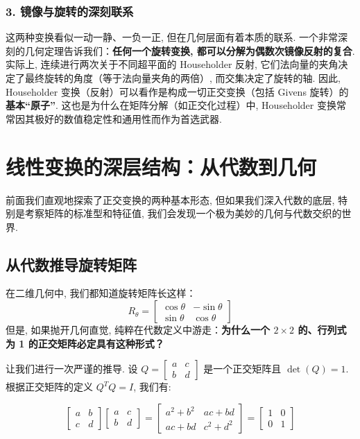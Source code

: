 \documentclass{ctexart}
\begin{document}
\subsubsection{3. 镜像与旋转的深刻联系}

这两种变换看似一动一静、一负一正, 但在几何层面有着本质的联系. 一个非常深刻的几何定理告诉我们：\textbf{任何一个旋转变换, 都可以分解为偶数次镜像反射的复合}. 
实际上, 连续进行两次关于不同超平面的 Householder 反射, 它们法向量的夹角决定了最终旋转的角度（等于法向量夹角的两倍）, 而交集决定了旋转的轴. 因此, Householder 变换（反射）可以看作是构成一切正交变换（包括 Givens 旋转）的\textbf{基本“原子”}. 这也是为什么在矩阵分解（如正交化过程）中, Householder 变换常常因其极好的数值稳定性和通用性而作为首选武器.

\section{线性变换的深层结构：从代数到几何}

前面我们直观地探索了正交变换的两种基本形态, 但如果我们深入代数的底层, 特别是考察矩阵的标准型和特征值, 我们会发现一个极为美妙的几何与代数交织的世界.

\subsection{从代数推导旋转矩阵}

在二维几何中, 我们都知道旋转矩阵长这样：
$$R_\theta = \begin{bmatrix} \cos\theta & -\sin\theta \\ \sin\theta & \cos\theta \end{bmatrix}$$
但是, 如果抛开几何直觉, 纯粹在代数定义中游走：\textbf{为什么一个 $2 \times 2$ 的、行列式为 1 的正交矩阵必定具有这种形式？}

让我们进行一次严谨的推导. 设 $Q = \begin{bmatrix} a & c \\ b & d \end{bmatrix}$ 是一个正交矩阵且 $\det(Q)=1$. 
根据正交矩阵的定义 $Q^T Q = I$, 我们有:

$$
\begin{bmatrix} a & b \\ c & d \end{bmatrix} \begin{bmatrix} a & c \\ b & d \end{bmatrix} = \begin{bmatrix} a^2+b^2 & ac+bd \\ ac+bd & c^2+d^2 \end{bmatrix} = \begin{bmatrix} 1 & 0 \\ 0 & 1 \end{bmatrix}
$$
\end{document}
